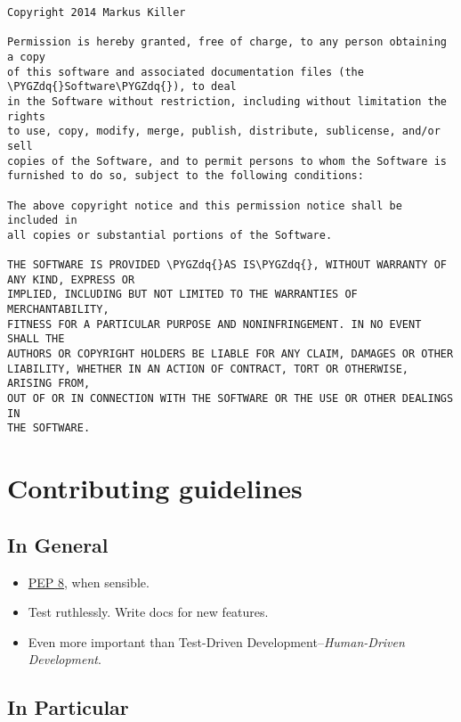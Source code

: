 \documentclass[letterpaper,10pt,english]{sphinxmanual}
\def\PYGZdq{\char`\"}
\begin{document}
\begin{Verbatim}[commandchars=\\\{\}]
Copyright 2014 Markus Killer

Permission is hereby granted, free of charge, to any person obtaining a copy
of this software and associated documentation files (the \PYGZdq{}Software\PYGZdq{}), to deal
in the Software without restriction, including without limitation the rights
to use, copy, modify, merge, publish, distribute, sublicense, and/or sell
copies of the Software, and to permit persons to whom the Software is
furnished to do so, subject to the following conditions:

The above copyright notice and this permission notice shall be included in
all copies or substantial portions of the Software.

THE SOFTWARE IS PROVIDED \PYGZdq{}AS IS\PYGZdq{}, WITHOUT WARRANTY OF ANY KIND, EXPRESS OR
IMPLIED, INCLUDING BUT NOT LIMITED TO THE WARRANTIES OF MERCHANTABILITY,
FITNESS FOR A PARTICULAR PURPOSE AND NONINFRINGEMENT. IN NO EVENT SHALL THE
AUTHORS OR COPYRIGHT HOLDERS BE LIABLE FOR ANY CLAIM, DAMAGES OR OTHER
LIABILITY, WHETHER IN AN ACTION OF CONTRACT, TORT OR OTHERWISE, ARISING FROM,
OUT OF OR IN CONNECTION WITH THE SOFTWARE OR THE USE OR OTHER DEALINGS IN
THE SOFTWARE.
\end{Verbatim}


\section{Contributing guidelines}
\label{contributing::doc}\label{contributing:contributing-guidelines}

\subsection{In General}
\label{contributing:in-general}\begin{itemize}
\item {} 
\href{http://www.python.org/dev/peps/pep-0008/}{PEP 8}, when sensible.

\item {} 
Test ruthlessly. Write docs for new features.

\item {} 
Even more important than Test-Driven Development--\emph{Human-Driven Development}.

\end{itemize}


\subsection{In Particular}
\label{contributing:pep-8}\label{contributing:in-particular}
\end{document}

